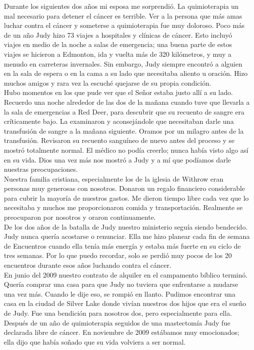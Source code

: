 \documentclass[twoside, 12pt]{book}
\begin{document}
Durante los siguientes dos años mi esposa me sorprendió. La quimioterapia un mal necesario para detener el cáncer es terrible. Ver a la persona que más amas luchar contra el cáncer y someterse a quimioterapia fue muy doloroso. Poco más de un año Judy hizo 73 viajes a hospitales y clínicas de cáncer. Esto incluyó viajes en medio de la noche a salas de emergencia; una buena parte de estos viajes se hicieron a Edmonton, ida y vuelta más de 320 kilómetros, y muy a menudo en carreteras invernales. Sin embargo, Judy siempre encontró a alguien en la sala de espera o en la cama a su lado que necesitaba aliento u oración. Hizo muchos amigos y rara vez la escuché quejarse de su propia condición.\\

Hubo momentos en los que pude ver que el Señor estaba justo allí a su lado. Recuerdo una noche alrededor de las dos de la mañana cuando tuve que llevarla a la sala de emergencias a Red Deer, para descubrir que su recuento de sangre era críticamente bajo. La examinaron y aconsejándole que necesitaban darle una transfusión de sangre a la mañana siguiente. Oramos por un milagro antes de la transfusión. Revisaron su recuento sanguíneo de nuevo antes del proceso y se mostró totalmente normal. El médico no podía creerlo; nunca había visto algo así en su vida. Dios una vez más nos mostró a Judy y a mí que podíamos darle nuestras preocupaciones.\\

Nuestra familia cristiana, especialmente los de la iglesia de Withrow eran personas muy generosas con nosotros.  Donaron un regalo financiero considerable para cubrir la mayoría de nuestros gastos.  Me dieron tiempo libre cada vez que lo necesitaba y muchos me proporcionaron comida y transportación. Realmente se preocuparon por nosotros y oraron continuamente.\\

De los dos años de la batalla de Judy nuestro ministerio seguía siendo bendecido. Judy nunca quería acostarse o renunciar.  Ella me hizo planear cada fin de semana de Encuentros cuando ella tenía más energía y estaba más fuerte en su ciclo de tres semanas. Por lo que puedo recordar, solo se perdió muy pocos de los 20 encuentros durante esos años luchando contra el cáncer.\\

En junio del 2009 nuestro contrato de alquiler en el campamento bíblico terminó. Quería comprar una casa para que Judy no tuviera que enfrentarse a mudarse una vez más. Cuando le dije eso, se rompió en llanto. Pudimos encontrar una casa en la ciudad de Silver Lake donde vivían nuestros dos hijos que era el sueño de Judy. Fue una bendición para nosotros dos, pero especialmente para ella. Después de un año de quimioterapia seguidos de una mastectomía Judy fue declarada libre de cáncer. En noviembre de 2009 estábamos muy emocionados; ella dijo que había soñado que su vida volviera a ser normal.\\
\end{document}
